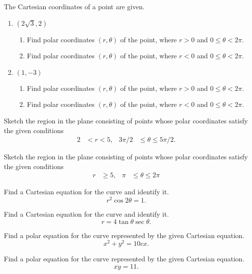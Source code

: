 \begin{problem}[WebAssign HW 33, \# 4]
The Cartesian coordinates of a point are given.
\begin{enumerate}[label=(\alph*)]
\item $(2\sqrt{3},2)$
  \begin{enumerate}[label=(\roman*)]
  \item Find polar coordinates $(r,\theta)$ of the point, where $r>0$ and
    $0\leq\theta<2\pi$.
  \item Find polar coordinates $(r,\theta)$ of the point, where $r<0$ and
    $0\leq\theta<2\pi$.
  \end{enumerate}
\item $(1,-3)$
  \begin{enumerate}[label=(\roman*)]
  \item Find polar coordinates $(r,\theta)$ of the point, where $r>0$ and
    $0\leq\theta<2\pi$.
  \item Find polar coordinates $(r,\theta)$ of the point, where $r<0$ and
    $0\leq\theta<2\pi$.
  \end{enumerate}
\end{enumerate}
\end{problem}
\begin{problem}[WebAssign HW 33, \# 5]
Sketch the region in the plane consisting of points whose polar coordinates
satisfy the given conditions
\[
  \begin{aligned}
    2&<r<5,&3\pi/2&\leq\theta\leq 5\pi/2.
  \end{aligned}
\]
\end{problem}
\begin{problem}[WebAssign HW 33, \# 6]
Sketch the region in the plane consisting of points whose polar coordinates
satisfy the given conditions
\[
  \begin{aligned}
    r&\geq 5,&\pi&\leq\theta\leq 2\pi
  \end{aligned}
\]
\end{problem}
\begin{problem}[WebAssign HW 33, \# 7]
Find a Cartesian equation for the curve and identify it.
\[
r^2\cos 2\theta=1.
\]
\end{problem}
\begin{problem}[WebAssign HW 33, \# 8]
Find a Cartesian equation for the curve and identify it.
\[
r=4\tan\theta\sec\theta.
\]
\end{problem}
\begin{problem}[WebAssign HW 33, \# 9]
Find a polar equation for the curve represented by the given Cartesian
equation.
\[
  x^2+y^2=10cx.
\]
\end{problem}
\begin{problem}[WebAssign HW 33, \# 10]
Find a polar equation for the curve represented by the given Cartesian
equation.
\[
xy=11.
\]
\end{problem}

